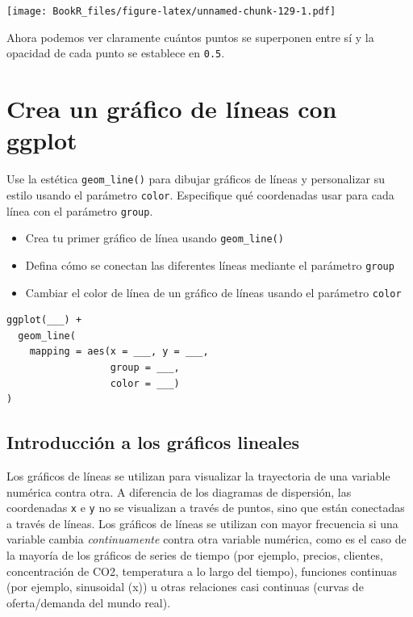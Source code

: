 \documentclass[
]{book}
\providecommand{\tightlist}{%
  \setlength{\itemsep}{0pt}\setlength{\parskip}{0pt}}
\begin{document}
\texttt{[image: BookR\_files/figure-latex/unnamed-chunk-129-1.pdf]}

Ahora podemos ver claramente cuántos puntos se superponen entre sí y la opacidad de cada punto se establece en \texttt{0.5}.

\hypertarget{crea-un-gruxe1fico-de-luxedneas-con-ggplot}{%
\section{Crea un gráfico de líneas con ggplot}\label{crea-un-gruxe1fico-de-luxedneas-con-ggplot}}

Use la estética \texttt{geom\_line()} para dibujar gráficos de líneas y personalizar su estilo usando el parámetro \texttt{color}. Especifique qué coordenadas usar para cada línea con el parámetro \texttt{group}.

\begin{itemize}
\tightlist
\item
  Crea tu primer gráfico de línea usando \texttt{geom\_line()}
\item
  Defina cómo se conectan las diferentes líneas mediante el parámetro \texttt{group}
\item
  Cambiar el color de línea de un gráfico de líneas usando el parámetro \texttt{color}
\end{itemize}

\begin{verbatim}
ggplot(___) + 
  geom_line(
    mapping = aes(x = ___, y = ___, 
                  group = ___, 
                  color = ___)
)
\end{verbatim}

\hypertarget{introducciuxf3n-a-los-gruxe1ficos-lineales}{%
\subsection{Introducción a los gráficos lineales}\label{introducciuxf3n-a-los-gruxe1ficos-lineales}}

Los gráficos de líneas se utilizan para visualizar la trayectoria de una variable numérica contra otra. A diferencia de los diagramas de dispersión, las coordenadas \texttt{x} e \texttt{y} no se visualizan a través de puntos, sino que están conectadas a través de líneas. Los gráficos de líneas se utilizan con mayor frecuencia si una variable cambia \emph{continuamente} contra otra variable numérica, como es el caso de la mayoría de los gráficos de series de tiempo (por ejemplo, precios, clientes, concentración de CO2, temperatura a lo largo del tiempo), funciones continuas (por ejemplo, sinusoidal (x)) u otras relaciones casi continuas (curvas de oferta/demanda del mundo real).
\end{document}
